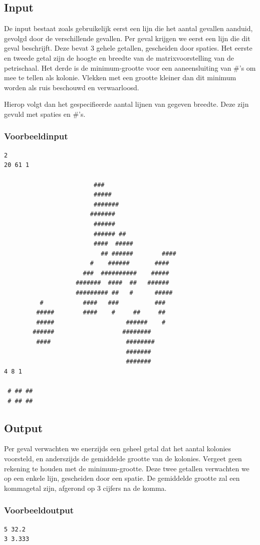 \subsection*{Input}

De input bestaat zoals gebruikelijk eerst een lijn die het aantal gevallen
aanduid, gevolgd door de verschillende gevallen. Per geval krijgen we eerst een
lijn die dit geval beschrijft. Deze bevat 3 gehele getallen, gescheiden door
spaties. Het eerste en tweede getal zijn de hoogte en breedte van de
matrixvoorstelling van de petrischaal. Het derde is de minimum-grootte voor een
aaneensluiting van \#'s om mee te tellen als kolonie. Vlekken met een grootte
kleiner dan dit minimum worden als ruis beschouwd en verwaarloosd.

Hierop volgt dan het gespecifieerde aantal lijnen van gegeven breedte. Deze zijn
gevuld met spaties en \#'s.

\subsubsection*{Voorbeeldinput}

\begin{verbatim}
2
20 61 1

                         ###
                         #####
                         #######
                        #######
                         ######
                         ###### ##
                         ####  #####
                           ## ######        ####
                        #    ######       ####
                      ###  ##########    #####
                    #######  ####  ##   ######
                    ######### ##   #      #####
          #           ####   ###          ###
         #####        ####    #     ##     ##
         #####                    ######    #
        ######                   ########
         ####                     ########
                                  #######
                                  #######
4 8 1

 # ## ##
 # ## ##

\end{verbatim}

\subsection*{Output}

Per geval verwachten we enerzijds een geheel getal dat het aantal kolonies
voorsteld, en anderszijds de gemiddelde grootte van de kolonies. Vergeet geen
rekening te houden met de minimum-grootte. Deze twee getallen verwachten we op
een enkele lijn, gescheiden door een spatie. De gemiddelde grootte zal een
kommagetal zijn, afgerond op 3 cijfers na de komma.

\subsubsection*{Voorbeeldoutput}

\begin{verbatim}
5 32.2
3 3.333
\end{verbatim}

